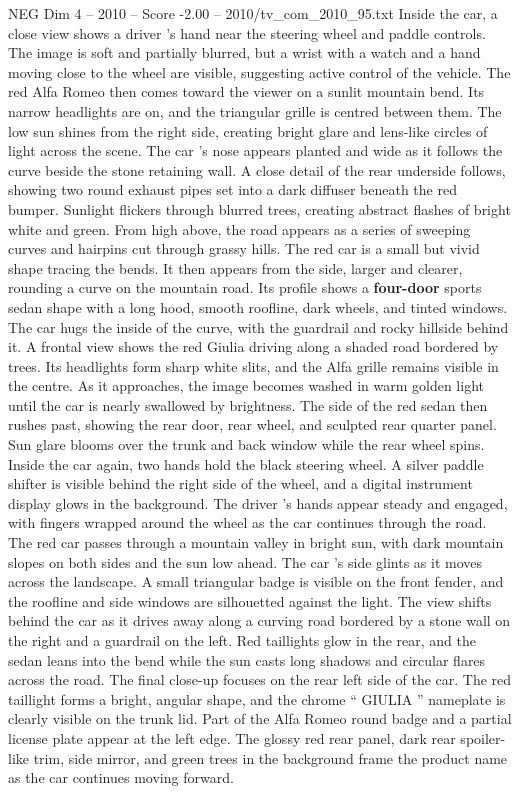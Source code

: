 \begin{textsample}{NEG Dim 4 – 2010 – Score -2.00 – 2010/tv\_com\_2010\_95.txt}
Inside the car, a close view shows a driver ’s hand near the steering wheel and paddle controls.
The image is soft and partially blurred, but a wrist with a watch and a hand moving close to the wheel are visible, suggesting active control of the vehicle.
The red Alfa Romeo then comes toward the viewer on a sunlit mountain bend.
Its narrow headlights are on, and the triangular grille is centred between them.
The low sun shines from the right side, creating bright glare and lens-like circles of light across the scene.
The car ’s nose appears planted and wide as it follows the curve beside the stone retaining wall.
A close detail of the rear underside follows, showing two round exhaust pipes set into a dark diffuser beneath the red bumper.
Sunlight flickers through blurred trees, creating abstract flashes of bright white and green.
From high above, the road appears as a series of sweeping curves and hairpins cut through grassy hills.
The red car is a small but vivid shape tracing the bends.
It then appears from the side, larger and clearer, rounding a curve on the mountain road.
Its profile shows a \textbf{four-door} sports sedan shape with a long hood, smooth roofline, dark wheels, and tinted windows.
The car hugs the inside of the curve, with the guardrail and rocky hillside behind it.
A frontal view shows the red Giulia driving along a shaded road bordered by trees.
Its headlights form sharp white slits, and the Alfa grille remains visible in the centre.
As it approaches, the image becomes washed in warm golden light until the car is nearly swallowed by brightness.
The side of the red sedan then rushes past, showing the rear door, rear wheel, and sculpted rear quarter panel.
Sun glare blooms over the trunk and back window while the rear wheel spins.
Inside the car again, two hands hold the black steering wheel.
A silver paddle shifter is visible behind the right side of the wheel, and a digital instrument display glows in the background.
The driver ’s hands appear steady and engaged, with fingers wrapped around the wheel as the car continues through the road.
The red car passes through a mountain valley in bright sun, with dark mountain slopes on both sides and the sun low ahead.
The car ’s side glints as it moves across the landscape.
A small triangular badge is visible on the front fender, and the roofline and side windows are silhouetted against the light.
The view shifts behind the car as it drives away along a curving road bordered by a stone wall on the right and a guardrail on the left.
Red taillights glow in the rear, and the sedan leans into the bend while the sun casts long shadows and circular flares across the road.
The final close-up focuses on the rear left side of the car.
The red taillight forms a bright, angular shape, and the chrome “ GIULIA ” nameplate is clearly visible on the trunk lid.
Part of the Alfa Romeo round badge and a partial license plate appear at the left edge.
The glossy red rear panel, dark rear spoiler-like trim, side mirror, and green trees in the background frame the product name as the car continues moving forward.

\end{textsample}
